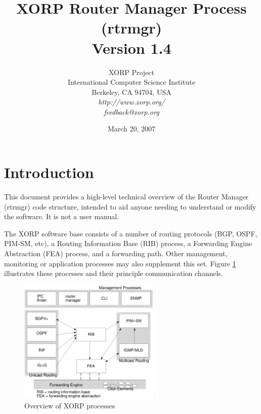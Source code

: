 \documentclass[11pt]{article}
\begin{document}
\title{XORP Router Manager Process (rtrmgr) \\
\vspace{1ex}
Version 1.4}
\author{ XORP Project					\\
	 International Computer Science Institute	\\
	 Berkeley, CA 94704, USA			\\
         {\it http://www.xorp.org/}			\\
	 {\it feedback@xorp.org}
}
\date{March 20, 2007}

\maketitle


\section{Introduction}

This document provides a high-level technical overview of the Router
Manager (rtrmgr) code structure, intended to aid anyone needing to
understand or modify the software.   It is not a user manual.

The XORP software base consists of a number of routing protocols (BGP,
OSPF, PIM-SM, etc), a Routing Information Base (RIB) process, a
Forwarding Engine Abstraction (FEA) process, and a forwarding path.
Other management, monitoring or application processes may also
supplement this set.  Figure \ref{overview} illustrates these
processes and their principle communication channels.

\begin{figure}[htb]
\centerline{\includegraphics[width=0.6\textwidth]{figs/processes3}}
\vspace{.05in}
\caption{\label{overview}Overview of XORP processes}
\end{figure}
\end{document}

